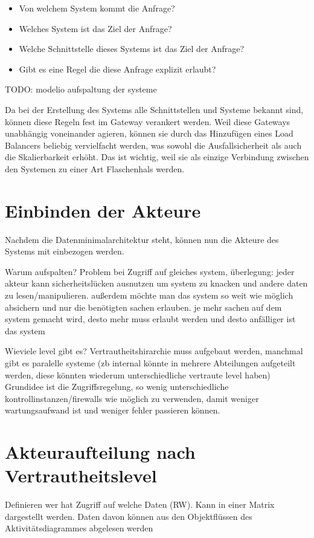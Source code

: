\begin{itemize}
  \item Von welchem System kommt die Anfrage?
  \item Welches System ist das Ziel der Anfrage?
  \item Welche Schnittstelle dieses Systems ist das Ziel der Anfrage?
  \item Gibt es eine Regel die diese Anfrage explizit erlaubt?
\end{itemize}

TODO: modelio aufspaltung der systeme

Da bei der Erstellung des Systems alle Schnittstellen und Systeme bekannt sind, können diese Regeln fest im Gateway verankert werden. Weil diese Gateways unabhängig voneinander agieren, können sie durch das Hinzufügen eines Load Balancers beliebig vervielfacht werden, was sowohl die Ausfallsicherheit als auch die Skalierbarkeit erhöht. Das ist wichtig, weil sie als einzige Verbindung zwischen den Systemen zu einer Art Flaschenhals werden.

\section{Einbinden der Akteure}
Nachdem die Datenminimalarchitektur steht, können nun die Akteure des Systems mit einbezogen werden.



Warum aufspalten? Problem bei Zugriff auf gleiches system, überlegung: jeder akteur kann sicherheitslücken ausnutzen um system zu knacken und andere daten zu lesen/manipulieren. außerdem möchte man das system so weit wie möglich absichern und nur die benötigten sachen erlauben. je mehr sachen auf dem system gemacht wird, desto mehr muss erlaubt werden und desto anfälliger ist das system

Wieviele level gibt es? Vertrautheitshirarchie muss aufgebaut werden, manchmal gibt es paralelle systeme (zb internal könnte in mehrere Abteilungen aufgeteilt werden, diese könnten wiederum unterschiedliche vertraute level haben) Grundidee ist die Zugriffsregelung, so wenig unterschiedliche kontrollinstanzen/firewalls wie möglich zu verwenden, damit weniger wartungsaufwand ist und weniger fehler passieren können.

\section{Akteuraufteilung nach Vertrautheitslevel}
Definieren wer hat Zugriff auf welche Daten (RW). Kann in einer Matrix dargestellt werden. Daten davon können aus den Objektflüssen des Aktivitätsdiagrammes abgelesen werden


